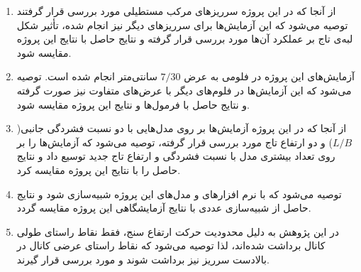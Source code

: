 \begin{enumerate}
\item	از آنجا که در این پروژه سرریزهای مرکب مستطیلی مورد بررسی قرار گرفتند توصیه می‌شود که این آزمایش‌ها برای سرریزهای دیگر نیز انجام شده، تأثیر شکل لبه‌ی تاج بر عملکرد آن‌ها مورد بررسی قرار گرفته و نتایج حاصل با نتایج این پروژه مقایسه شود.
\item
	آزمایش‌های این پروژه در فلومی به عرض $7/30$ سانتی‌متر انجام شده است. توصیه می‌شود که این آزمایش‌ها در فلوم‌های دیگر با عرض‌های متفاوت نیز صورت گرفته و نتایج حاصل با فرمول‌ها و نتایج این پروژه مقایسه شود.
\item 
	از آنجا که در این پروژه آزمایش‌ها بر روی مدل‌هایی با دو نسبت فشردگی جانبی($L/B$) و دو ارتفاع تاج مورد بررسی قرار گرفته، توصیه می‌شود که آزمایش‌ها را بر روی تعداد بیشتری مدل با نسبت‌ فشردگی و ارتفاع تاج جدید توسیع داد و نتایج حاصل را با نتایج این پروژه مقایسه کرد.
\item
	توصیه می‌شود که با نرم افزارهای  و   مدل‌های این پروژه شبیه‌سازی شود و نتایج حاصل از شبیه‌سازی عددی با نتایج آزمایشگاهی این پروژه مقایسه گردد.

\item
	در این پژوهش به دلیل محدودیت حرکت ارتفاع سنج، فقط نقاط راستای طولی کانال برداشت شده‌‌اند، لذا توصیه می‌شود که نقاط راستای عرضی کانال در بالادست سرریز نیز برداشت شوند و مورد بررسی قرار گیرند.
\end{enumerate}






















